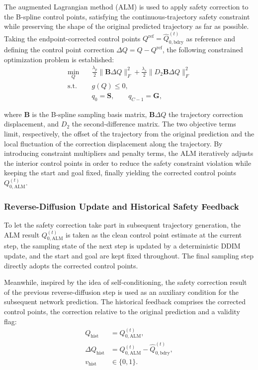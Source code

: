 \documentclass[journal]{IEEEtran}
\newcommand{\Qbdry}{\widehat{Q}_{0,\mathrm{bdry}}^{(t)}}
\newcommand{\Qalm}{Q_{0,\mathrm{ALM}}^{(t)}}
\begin{document}
The augmented Lagrangian method (ALM) is used to apply safety correction to the
B-spline control points, satisfying the continuous-trajectory safety constraint
while preserving the shape of the original predicted trajectory as far as
possible. Taking the endpoint-corrected control points
$Q^{\mathrm{ref}}=\Qbdry$ as reference and defining the control point correction
$\Delta Q=Q-Q^{\mathrm{ref}}$, the following constrained optimization problem is
established:
\begin{equation}
\begin{aligned}
\min_{Q}\quad
&\frac{\lambda_p}{2}\lVert\mathbf B\Delta Q\rVert_F^2
+\frac{\lambda_s}{2}\lVert D_2\mathbf B\Delta Q\rVert_F^2\\
\mathrm{s.t.}\quad
&g(Q)\leq0,\\
&q_0=\bm S,\qquad q_{C-1}=\bm G,
\end{aligned}
\end{equation}

where $\mathbf B$ is the B-spline sampling basis matrix, $\mathbf B\Delta Q$ the
trajectory correction displacement, and $D_2$ the second-difference matrix. The
two objective terms limit, respectively, the offset of the trajectory from the
original prediction and the local fluctuation of the correction displacement
along the trajectory. By introducing constraint multipliers and penalty terms,
the ALM iteratively adjusts the interior control points in order to reduce the
safety constraint violation while keeping the start and goal fixed, finally
yielding the corrected control points $\Qalm$.

\subsubsection{Reverse-Diffusion Update and Historical Safety Feedback}
To let the safety correction take part in subsequent trajectory generation, the
ALM result $\Qalm$ is taken as the clean control point estimate at the current
step, the sampling state of the next step is updated by a deterministic DDIM
update, and the start and goal are kept fixed throughout. The final sampling
step directly adopts the corrected control points.

Meanwhile, inspired by the idea of self-conditioning, the safety correction
result of the previous reverse-diffusion step is used as an auxiliary condition
for the subsequent network prediction. The historical feedback comprises the
corrected control points, the correction relative to the original prediction and
a validity flag:
\begin{equation}
\begin{aligned}
Q_{\mathrm{hist}}&=\Qalm,\\
\Delta Q_{\mathrm{hist}}&=\Qalm-\Qbdry,\\
v_{\mathrm{hist}}&\in\{0,1\}.
\end{aligned}
\end{equation}
\end{document}
